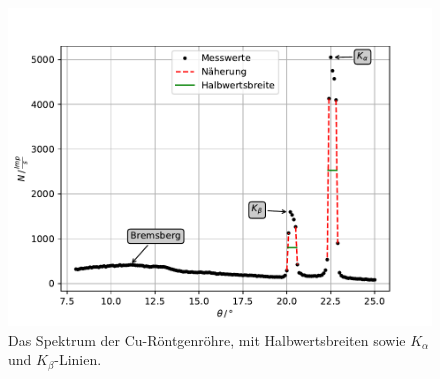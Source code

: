 \begin{figure}
  \centering
  \includegraphics[width=\textwidth]{content/data/spektrum.pdf}
  \caption{Das Spektrum der Cu-Röntgenröhre, mit Halbwertsbreiten sowie $K_\alpha$ und $K_\beta$-Linien.}
  \label{fig:emis}
\end{figure}

